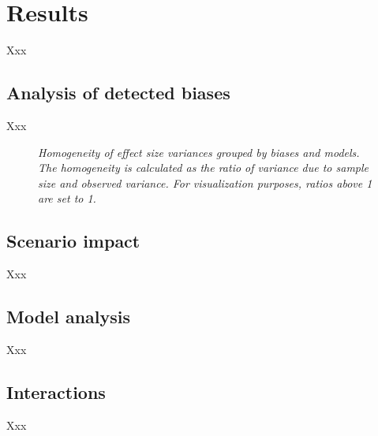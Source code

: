 \section{Results}
Xxx

\subsection{Analysis of detected biases}
Xxx

\begin{figure}[htbp]
    \centering
    
    \caption[Scenario overview]{\centering \textit{Homogeneity of effect size variances grouped by biases and models. The homogeneity is calculated as the ratio of variance due to sample size and observed variance. For visualization purposes, ratios above 1 are set to 1.}}
    \label{fig:homogeneity-heatmap}
\end{figure}

\subsection{Scenario impact}
Xxx

\subsection{Model analysis}
Xxx

\subsection{Interactions}
Xxx
